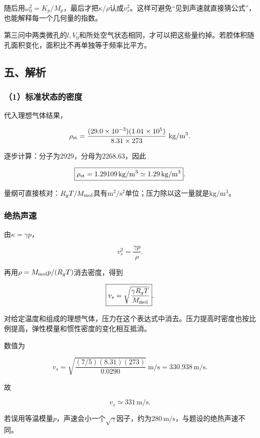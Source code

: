 \documentclass[12pt,a4paper,fontset=fandol]{ctexart}
\begin{document}
随后用\(\omega_0^2=K_p/M_p\)，最后才把\(\kappa/\rho\)认成\(v_s^2\)。这样可避免``见到声速就直接猜公式''，也能解释每一个几何量的指数。

第三问中两类微孔的\(l,V_0\)和所处空气状态相同，才可以把这些量约掉。若腔体积随孔面积变化，面积比不再单独等于频率比平方。

\subsection{五、解析}\label{ux4e94ux89e3ux6790-3}

\subsubsection{（1）标准状态的密度}\label{ux6807ux51c6ux72b6ux6001ux7684ux5bc6ux5ea6}

代入理想气体结果，

\[
\rho_{\rm st}
=\frac{(29.0\times10^{-3})(1.01\times10^5)}
{8.31\times273}
\ \mathrm{kg/m^3}.
\]

逐步计算：分子为\(2929\)，分母为\(2268.63\)，因此

\[
\boxed{\rho_{\rm st}=1.29109\,\mathrm{kg/m^3}
\simeq1.29\,\mathrm{kg/m^3}}.
\]

量纲可直接核对：\(R_gT/M_{\rm mol}\)具有\(\mathrm{m^2/s^2}\)单位；压力除以这一量就是\(\mathrm{kg/m^3}\)。

\subsubsection{绝热声速}\label{ux7eddux70edux58f0ux901f}

由\(\kappa=\gamma p\)，

\[
v_s^2=\frac{\gamma p}{\rho}.
\]

再用\(\rho=M_{\rm mol}p/(R_gT)\)消去密度，得到

\[
\boxed{v_s=\sqrt{\frac{\gamma R_gT}{M_{\rm mol}}}}.
\]

对给定温度和组成的理想气体，压力在这个表达式中消去。压力提高时密度也按比例提高，弹性模量和惯性密度的变化相互抵消。

数值为

\[
v_s=
\sqrt{\frac{(7/5)(8.31)(273)}{0.0290}}
\ \mathrm{m/s}
=330.938\,\mathrm{m/s}.
\]

故

\[
\boxed{v_s\simeq331\,\mathrm{m/s}}.
\]

若误用等温模量\(p\)，声速会小一个\(\sqrt\gamma\)因子，约为\(280\,\mathrm{m/s}\)，与题设的绝热声速不同。
\end{document}
